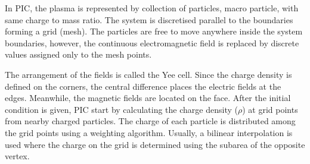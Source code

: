 \documentclass[12pt]{article}
\newenvironment{changemargin}[2]{%
\begin{list}{}{%
\setlength{\topsep}{0pt}%
\setlength{\leftmargin}{#1}%
\setlength{\rightmargin}{#2}%
\setlength{\listparindent}{\parindent}%
\setlength{\itemindent}{\parindent}%
\setlength{\parsep}{\parskip}%
}%
\item[]}{\end{list}}
\begin{document}
\begin{changemargin}{-3cm}{-3cm}
    In PIC, the plasma is represented by collection of particles, macro particle, with same charge to mass ratio. The system is discretised parallel to the boundaries forming a grid (mesh). The particles are free to move anywhere inside the system boundaries, however, the continuous electromagnetic field is replaced by discrete values assigned only to the mesh points.

    The arrangement of the fields is called the Yee cell.
    Since the charge density is defined on the corners, the central difference places the electric fields at the edges. Meanwhile, the magnetic fields are located on the face. After the initial condition is given, PIC start by calculating the charge density ($\rho$) at grid points from nearby charged
    particles. The charge of each particle is distributed among the grid points using a weighting algorithm. Usually, a bilinear interpolation is used where the charge on the grid is determined using the subarea of the opposite vertex.

    \vspace*{0.5cm}


\end{changemargin}
\end{document}
